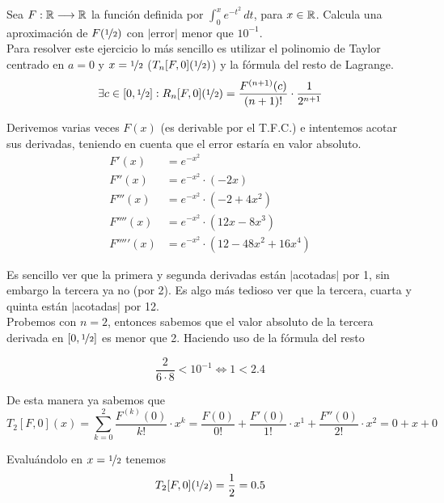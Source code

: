 \documentclass[12pt]{article}
\begin{document}
	\begin{ejercicio}[2 puntos]
		Sea $F:\mathbb{R}\longrightarrow\mathbb{R}$ la función definida por $\displaystyle \int_{0}^{x} e^{-t^2} \, dt$, para $x \in \mathbb{R}$. Calcula una aproximación de $F(\nicefrac{1}{2})$ con $|$error$|$ menor que $10^{-1}$. \\
		
		Para resolver este ejercicio lo más sencillo es utilizar el polinomio de Taylor centrado en $a=0$ y $x=\nicefrac{1}{2}$ ($T_n[F, 0](\nicefrac{1}{2})$) y la fórmula del resto de Lagrange.
		$$\exists c \in [0, \nicefrac{1}{2}] : R_n[F,0](\nicefrac{1}{2})=\frac{F^{(n+1)}(c)}{(n+1)!}\cdot\frac{1}{2^{n+1}}$$
		
		Derivemos varias veces $F(x)$ (es derivable por el T.F.C.) e intentemos acotar sus derivadas, teniendo en cuenta que el error estaría en valor absoluto.
		\begin{align*}
			F'(x)&=e^{-x^2}\\
			F''(x)&=e^{-x^2}\cdot (-2x)\\
			F'''(x)&=e^{-x^2}\cdot (-2+4x^2)\\
			F''''(x)&= e^{-x^2}\cdot (12x-8x^3)\\
			F'''''(x)&= e^{-x^2}\cdot (12-48x^2+16x^4)
		\end{align*}
		
		Es sencillo ver que la primera y segunda derivadas están $|$acotadas$|$ por 1, sin embargo la tercera ya no (por 2). Es algo más tedioso ver que la tercera, cuarta y quinta están $|$acotadas$|$ por 12. \\
		
		Probemos con $n=2$, entonces sabemos que el valor absoluto de la tercera derivada en $[0, \nicefrac{1}{2}]$ es menor que 2. Haciendo uso de la fórmula del resto
		
		$$ \frac{2}{6\cdot8} < 10^{-1} \iff 1 < 2.4$$
		
		De esta manera ya sabemos que
		$$ T_2[F,0](x)=\sum_{k=0}^{2} \frac{F^{(k)}(0)}{k!}\cdot x^k = \frac{F(0)}{0!} + \frac{F'(0)}{1!}\cdot x^1 + \frac{F''(0)}{2!}\cdot x^2 = 0 + x + 0$$
		
		Evaluándolo en $x=\nicefrac{1}{2}$ tenemos
		$$ T_2[F,0](\nicefrac{1}{2}) = \frac{1}{2} = 0.5$$
	
	\end{ejercicio}
	
\end{document}
